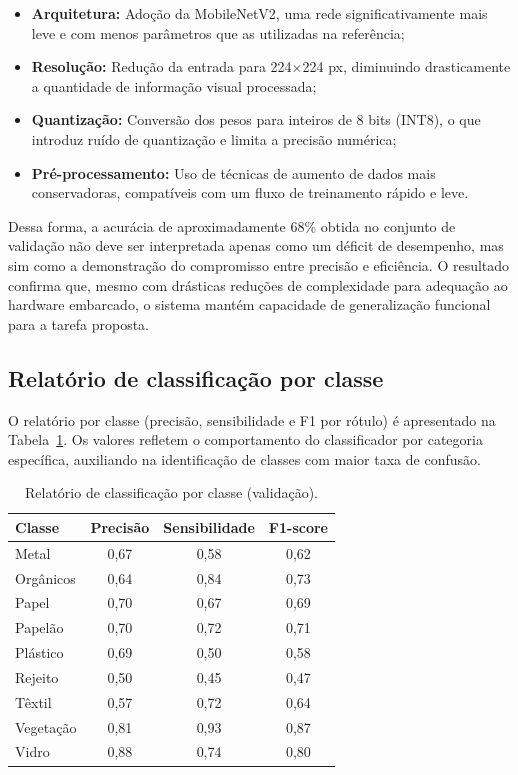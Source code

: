 \documentclass[repeatfields,xlists,xpacks,oneside]{ufrgscca}
\begin{document}
\begin{itemize}
    \item \textbf{Arquitetura:} Adoção da MobileNetV2, uma rede significativamente mais leve e com menos parâmetros que as utilizadas na referência;
    \item \textbf{Resolução:} Redução da entrada para 224$\times$224 px, diminuindo drasticamente a quantidade de informação visual processada;
    \item \textbf{Quantização:} Conversão dos pesos para inteiros de 8 bits (INT8), o que introduz ruído de quantização e limita a precisão numérica;
    \item \textbf{Pré-processamento:} Uso de técnicas de aumento de dados mais conservadoras, compatíveis com um fluxo de treinamento rápido e leve.
\end{itemize}

Dessa forma, a acurácia de aproximadamente 68\% obtida no conjunto de validação não deve ser interpretada apenas como um déficit de desempenho, mas sim como a demonstração do compromisso entre precisão e eficiência. O resultado confirma que, mesmo com drásticas reduções de complexidade para adequação ao hardware embarcado, o sistema mantém capacidade de generalização funcional para a tarefa proposta.

\subsection{Relatório de classificação por classe}
O relatório por classe (precisão, sensibilidade e F1 por rótulo) é apresentado na Tabela~\ref{tab:class_report}. Os valores refletem o comportamento do classificador por categoria específica, auxiliando na identificação de classes com maior taxa de confusão.

\begin{table}[H]
    \begin{center}
        \caption{Relatório de classificação por classe (validação).}
        \label{tab:class_report}
        \begin{tabular}{l c c c}
            \hline
            \textbf{Classe} & \textbf{Precisão} & \textbf{Sensibilidade} & \textbf{F1-score} \\
            \hline
            Metal & 0,67 & 0,58 & 0,62 \\
            Orgânicos & 0,64 & 0,84 & 0,73 \\
            Papel & 0,70 & 0,67 & 0,69 \\
            Papelão & 0,70 & 0,72 & 0,71 \\
            Plástico & 0,69 & 0,50 & 0,58 \\
            Rejeito & 0,50 & 0,45 & 0,47 \\
            Têxtil & 0,57 & 0,72 & 0,64 \\
            Vegetação & 0,81 & 0,93 & 0,87 \\
            Vidro & 0,88 & 0,74 & 0,80 \\
            \hline
        \end{tabular}
    \end{center}
    {}
\end{table}
\end{document}
